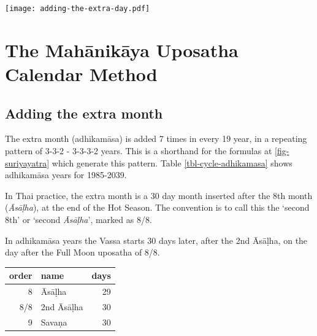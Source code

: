 \documentclass[11pt,oneside]{memoir-article}
\begin{document}
\texttt{[image: adding-the-extra-day.pdf]}

\clearpage

\chapter{The Mahānikāya Uposatha Calendar Method}
\label{sec-2}
\section{Adding the extra month}
\label{sec-2-1}

The extra month (adhikamāsa) is added 7 times in every 19 year, in a repeating
pattern of 3-3-2 - 3-3-3-2 years. This is a shorthand for the formulas
at \ref{fig-suriyayatra} which generate this pattern. Table
\ref{tbl-cycle-adhikamasa} shows adhikamāsa years for 1985-2039.

In Thai practice, the extra month is a 30 day month inserted after the
8th month (\emph{Āsāḷha}), at the end of the Hot Season. The convention is
to call this the `second 8th' or `second \emph{Āsāḷha}', marked as 8/8.

In adhikamāsa years the Vassa starts 30 days later, after the 2nd
Āsāḷha, on the day after the Full Moon uposatha of 8/8.

\begin{center}
\begin{tabular}{rlr}
order & name & days\\
\hline
8 & Āsāḷha & 29\\
8/8 & 2nd Āsāḷha & 30\\
9 & Savaṇa & 30\\
\end{tabular}
\end{center}
\end{document}
